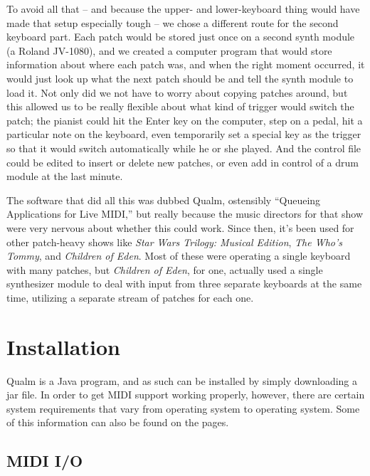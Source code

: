 \documentclass{article}
\newcommand{\q}{{\textsf{Qualm}}\xspace}
\begin{document}
To avoid all that -- and because the upper- and lower-keyboard thing
would have made that setup especially tough -- we chose a different
route for the second keyboard part.  Each patch would be stored just
once on a second synth module (a Roland JV-1080), and we created a
computer program that would store information about where each patch
was, and when the right moment occurred, it would just look up what
the next patch should be and tell the synth module to load it.  Not
only did we not have to worry about copying patches around, but this
allowed us to be really flexible about what kind of trigger would
switch the patch; the pianist could hit the Enter key on the computer,
step on a pedal, hit a particular note on the keyboard, even
temporarily set a special key as the trigger so that it would switch
automatically while he or she played.  And the control file could be
edited to insert or delete new patches, or even add in control of a
drum module at the last minute.

The software that did all this was dubbed \q, ostensibly ``Queueing
Applications for Live MIDI,'' but really because the music directors
for that show were very nervous about whether this could work.  Since
then, it's been used for other patch-heavy shows like {\em Star Wars
Trilogy: Musical Edition}, {\em The Who's Tommy}, and {\em Children of
Eden}.  Most of these were operating a single keyboard with many
patches, but {\em Children of Eden}, for one, actually used a single
synthesizer module to deal with input from three separate keyboards at
the same time, utilizing a separate stream of patches for each one.

\begin{latexonly}\newpage\end{latexonly}
\section{Installation}

\q is a Java program, and as such can be installed by simply
downloading a jar file.  In order to get MIDI support working
properly, however, there are certain system requirements that vary
from operating system to operating system.  Some of this information
can also be found on the  pages.

\subsection{MIDI I/O}
\end{document}
